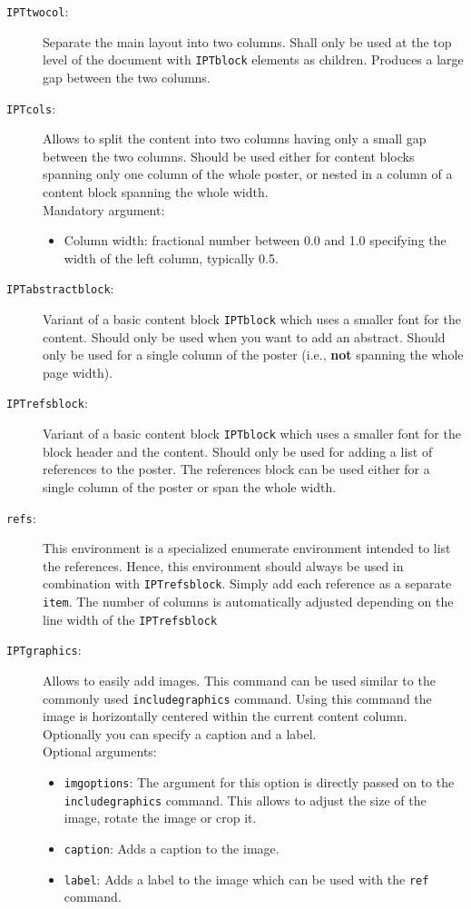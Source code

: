 \begin{description}
	\item[\texttt{IPTtwocol}:] Separate the main layout into two columns. Shall only be used at the top level of the document with \texttt{IPTblock} elements as children. Produces a large gap between the two columns.

	\item[\texttt{IPTcols}:] Allows to split the content into two columns having only a small gap between the two columns. Should be used either for content blocks spanning only one column of the whole poster, or nested in a column of a content block spanning the whole width.\\
	Mandatory argument:
		\begin{itemize}
			\item Column width: fractional number between 0.0 and 1.0 specifying the width of the left column, typically 0.5.
		\end{itemize}

	\item[\texttt{IPTabstractblock}:] Variant of a basic content block \texttt{IPTblock} which uses a smaller font for the content. Should only be used when you want to add an abstract. Should only be used for a single column of the poster (i.e., \textbf{not} spanning the whole page width).

	\item[\texttt{IPTrefsblock}:] Variant of a basic content block \texttt{IPTblock} which uses a smaller font for the block header and the content. Should only be used for adding a list of references to the poster. The references block can be used either for a single column of the poster or span the whole width.


	\item[\texttt{refs}:] This environment is a specialized enumerate environment intended to list the references. Hence, this environment should always be used in combination with \texttt{IPTrefsblock}. Simply add each reference as a separate \texttt{\bs{}item}. The number of columns is automatically adjusted depending on the line width of the \texttt{\bs{}IPTrefsblock}\\

	\item[\texttt{\bs{}IPTgraphics}:] Allows to easily add images. This command can be used similar to the commonly used \texttt{includegraphics} command. Using this command the image is horizontally centered within the current content column. Optionally you can specify a caption and a label.\\
	Optional arguments:
	\begin{itemize}
		\item \texttt{imgoptions}: The argument for this option is directly passed on to the \texttt{includegraphics} command. This allows to adjust the size of the image, rotate the image or crop it.
		\item \texttt{caption}: Adds a caption to the image.
		\item \texttt{label}: Adds a label to the image which can be used with the \texttt{ref} command.
	\end{itemize}



\end{description}
